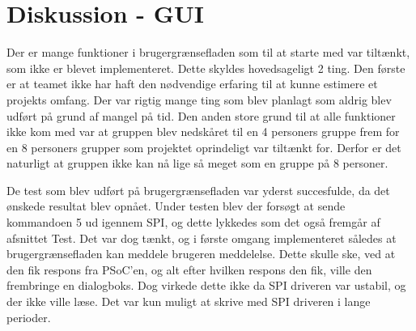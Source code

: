 \section{Diskussion - GUI}

Der er mange funktioner i brugergrænsefladen som til at starte med var tiltænkt, som ikke er blevet implementeret. Dette skyldes hovedsageligt 2 ting. Den første er at teamet ikke har haft den nødvendige erfaring til at kunne estimere et projekts omfang. Der var rigtig mange ting som blev planlagt som aldrig blev udført på grund af mangel på tid. Den anden store grund til at alle funktioner ikke kom med var at gruppen blev nedskåret til en 4 personers gruppe frem for en 8 personers grupper som projektet oprindeligt var tiltænkt for. Derfor er det naturligt at gruppen ikke kan nå lige så meget som en gruppe på 8 personer.

De test som blev udført på brugergrænsefladen var yderst succesfulde, da det ønskede resultat blev opnået. Under testen blev der forsøgt at sende kommandoen 5 ud igennem SPI, og dette lykkedes som det også fremgår af afsnittet Test.  Det var dog tænkt, og i første omgang implementeret således at brugergrænsefladen kan meddele brugeren meddelelse. Dette skulle ske, ved at den fik respons fra PSoC’en, og alt efter hvilken respons den fik, ville den frembringe en dialogboks. Dog virkede dette ikke da SPI driveren var ustabil, og der ikke ville læse. Det var kun muligt at skrive med SPI driveren i lange perioder.
